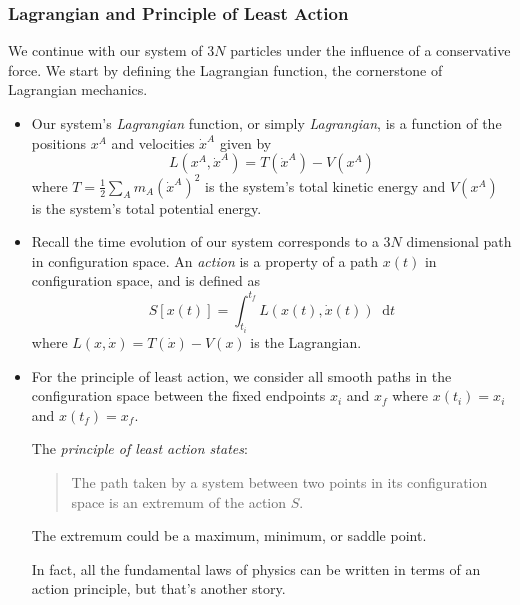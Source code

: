 \documentclass[11pt, a4paper]{article}
\newcommand{\diff}{\mathop{}\!\mathrm{d}} %
\begin{document}
\subsubsection{Lagrangian and Principle of Least Action}
We continue with our system of $ 3N $ particles under the influence of a conservative force. We start by defining the Lagrangian function, the cornerstone of Lagrangian mechanics.
\begin{itemize}
	\item Our system's \textit{Lagrangian} function, or simply \textit{Lagrangian}, is a function of the positions $ x^{A} $ and velocities $ \dot{x}^{A} $ given by
	\begin{equation*}
		L(x^{A}, \dot{x}^{A}) = T(\dot{x}^{A}) - V(x^{A})
	\end{equation*}
	where $ T = \frac{1}{2}\sum_{A}m_{A}(\dot{x}^{A})^{2}$ is the system's total kinetic energy and $ V(x^{A}) $ is the system's total potential energy. 
	
	\item Recall the time evolution of our system corresponds to a $ 3N $ dimensional path in configuration space. An \textit{action} is a property of a path $ x(t) $ in configuration space, and is defined as
	\begin{equation*}
		S[x(t)] = \int_{t_i}^{t_f} L(x(t), \dot{x}(t)) \diff t
	\end{equation*}
	where $ L(x, \dot x) = T(\dot{x}) - V(x) $ is the Lagrangian. 
	

	
	\item For the principle of least action, we consider all smooth paths in the configuration space between the fixed endpoints $ x_{i}$ and $ x_{f} $ where $ x(t_i) = x_i $ and $ x(t_f) = x_{f} $.
	
	The \textit{principle of least action states}: 
	\begin{quote}
		The path taken by a system between two points in its configuration space is an extremum of the action $ S $.
	\end{quote}
	The extremum could be a maximum, minimum, or saddle point.
	
	In fact, all the fundamental laws of physics can be written in terms of an action principle, but that's another story.
	

\end{itemize}
\end{document}
